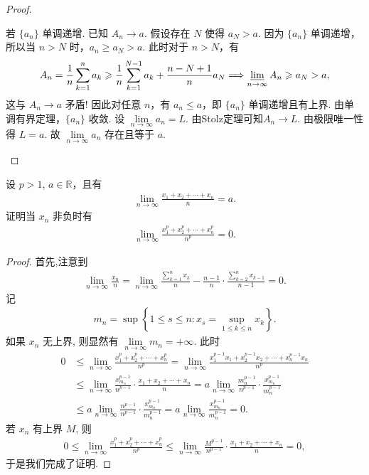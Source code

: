 \documentclass[../../main.tex]{subfiles}%
\begin{document}
\begin{proof}
\begin{enumerate}[(1)]
若 $\{a_n\}$ 单调递增.
已知 $A_n \to a$.
假设存在 $N$ 使得 $a_N > a$. 因为 $\{a_n\}$ 单调递增，所以当 $n > N$ 时，$a_n \geqslant a_N > a$.
此时对于 $n > N$，有
\begin{align*}
A_n = \frac{1}{n}\sum\limits_{k=1}^n a_k \geqslant \frac{1}{n}\sum\limits_{k=1}^{N-1} a_k + \frac{n-N+1}{n} a_N\Longrightarrow \varliminf\limits_{n\to\infty} A_n \geqslant a_N > a,
\end{align*}
这与 $A_n \to a$ 矛盾!
因此对任意 $n$，有 $a_n \leqslant a$，即 $\{a_n\}$ 单调递增且有上界.
由单调有界定理，$\{a_n\}$ 收敛. 设 $\lim\limits_{n\to\infty} a_n = L$.
由Stolz定理可知$A_n \to L$. 由极限唯一性得 $L = a$.
故 $\lim\limits_{n\to\infty} a_n$ 存在且等于 $a$.
\end{enumerate}
\end{proof}

\begin{proposition}\label{proposition:p次切萨罗和的性质}
设 $p>1$, $a\in\mathbb{R}$，且有 
\begin{align*}
\lim\limits_{n\to\infty} \frac{x_1+x_2+\cdots+x_n}{n}=a.
\end{align*}
证明当 $x_n$ 非负时有 
\begin{align*}
\lim\limits_{n\to\infty} \frac{x_1^p+x_2^p+\cdots+x_n^p}{n^p}=0.
\end{align*}
\end{proposition}
\begin{proof}
首先,注意到
\begin{align*}
\lim\limits_{n \to \infty} \frac{x_n}{n}
= \lim\limits_{n \to \infty} \frac{\sum\limits_{k=1}^n x_k}{n}
- \frac{n-1}{n} \cdot \frac{\sum\limits_{k=2}^n x_{k-1}}{n-1}
= 0.
\end{align*}
记
\begin{align*}
m_n = \sup \left\{ 1 \leqslant s \leqslant n : x_s = \sup_{1 \leqslant k \leqslant n} x_k \right\}.
\end{align*}
如果 $x_n$ 无上界, 则显然有 $\lim\limits_{n \to \infty} m_n = +\infty$. 此时
\begin{align*}
0&\leqslant \lim_{n\rightarrow \infty} \frac{x_{1}^{p}+x_{2}^{p}+\cdots +x_{n}^{p}}{n^p}=\lim_{n\rightarrow \infty} \frac{x_{1}^{p-1}x_1+x_{2}^{p-1}x_2+\cdots +x_{n}^{p-1}x_n}{n^p}
\\
&\leqslant \lim_{n\rightarrow \infty} \frac{x_{m_n}^{p-1}}{n^{p-1}}\cdot \frac{x_1+x_2+\cdots +x_n}{n}=a\lim_{n\rightarrow \infty} \frac{m_{n}^{p-1}}{n^{p-1}}\cdot \frac{x_{m_n}^{p-1}}{m_{n}^{p-1}}
\\
&\leqslant a\lim_{n\rightarrow \infty} \frac{n^{p-1}}{n^{p-1}}\cdot \frac{x_{m_n}^{p-1}}{m_{n}^{p-1}}=a\lim_{n\rightarrow \infty} \frac{x_{m_n}^{p-1}}{m_{n}^{p-1}}=0.
\end{align*}
若 $x_n$ 有上界 $M$, 则
\begin{align*}
0\leqslant \lim_{n\rightarrow \infty} \frac{x_{1}^{p}+x_{2}^{p}+\cdots +x_{n}^{p}}{n^p}\leqslant \lim_{n\rightarrow \infty} \frac{M^{p-1}}{n^{p-1}}\cdot \frac{x_1+x_2+\cdots +x_n}{n}=0,
\end{align*}
于是我们完成了证明.
\end{proof}
\end{document}
